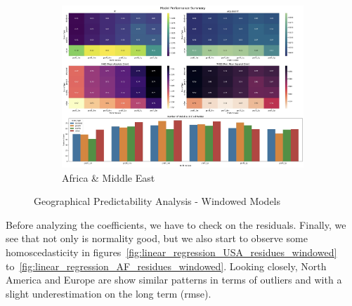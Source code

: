 \documentclass[11pt,english,a4paper,hidelinks]{book}
\begin{document}
\begin{figure}[H]
    \begin{subfigure}[b]{0.48\textwidth}
        \centering
        \includegraphics[width=\textwidth]{images/code/models/linear_regression/third_model/AF - performance.png}
        \caption{Africa \& Middle East}
    \end{subfigure}
    \caption{Geographical Predictability Analysis - Windowed Models}
    \label{fig:region_performance_windowed_models}
\end{figure}

\noindent Before analyzing the coefficients, we have to check on the residuals. Finally, we see that not only is normality good, but we also start to observe some homoscedasticity in figures~\ref{fig:linear_regression_USA_residues_windowed} to~\ref{fig:linear_regression_AF_residues_windowed}. Looking closely, North America and Europe are show similar patterns in terms of outliers and with a slight underestimation on the long term (\acrshort{rmse}).
\end{document}
